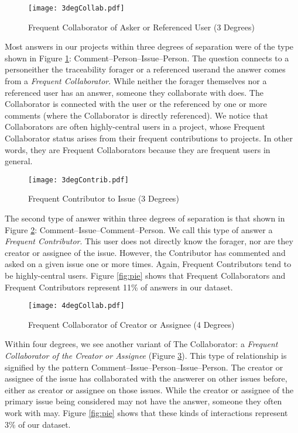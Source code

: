 \begin{figure}[ht]
	\centering
	\texttt{[image: 3degCollab.pdf]}
	\caption{Frequent Collaborator of Asker or Referenced User (3 Degrees)}
	\label{fig:3degCollab}
\end{figure}

Most answers in our projects within three degrees of separation were of the type shown in Figure \ref{fig:3degCollab}: Comment--Person--Issue--Person. The question connects to a person\textemdash either the traceability forager or a referenced user\textemdash and the answer comes from a \textit{Frequent Collaborator}. While neither the forager themselves nor a referenced user has an answer, someone they collaborate with does. The Collaborator is connected with the user or the referenced by one or more comments (where the Collaborator is directly referenced). We notice that Collaborators are often highly-central users in a project, whose Frequent Collaborator status arises from their frequent contributions to projects. In other words, they are Frequent Collaborators because they are frequent users in general.

\begin{figure}[ht]
	\centering
	\texttt{[image: 3degContrib.pdf]}
	\caption{Frequent Contributor to Issue (3 Degrees)}
	\label{fig:3degContrib}
\end{figure}

The second type of answer within three degrees of separation is that shown in Figure \ref{fig:3degContrib}: Comment--Issue--Comment--Person. We call this type of answer a \textit{Frequent Contributor}. This user does not directly know the forager, nor are they creator or assignee of the issue. However, the Contributor has commented and asked on a given issue one or more times. Again, Frequent Contributors tend to be highly-central users. Figure \ref{fig:pie} shows that Frequent Collaborators and Frequent Contributors represent 11\% of answers in our dataset.

\begin{figure}[ht]
	\centering
	\texttt{[image: 4degCollab.pdf]}
	\caption{Frequent Collaborator of Creator or Assignee (4 Degrees)}
	\label{fig:4degContrib}
\end{figure}

Within four degrees, we see another variant of The Collaborator: a \textit{Frequent Collaborator of the Creator or Assignee} (Figure \ref{fig:4degContrib}). This type of relationship is signified by the pattern Comment--Issue--Person--Issue--Person. The creator or assignee of the issue has collaborated with the answerer on other issues before, either as creator or assignee on those issues. While the creator or assignee of the primary issue being considered may not have the answer, someone they often work with may. Figure \ref{fig:pie} shows that these kinds of interactions represent 3\% of our dataset.

